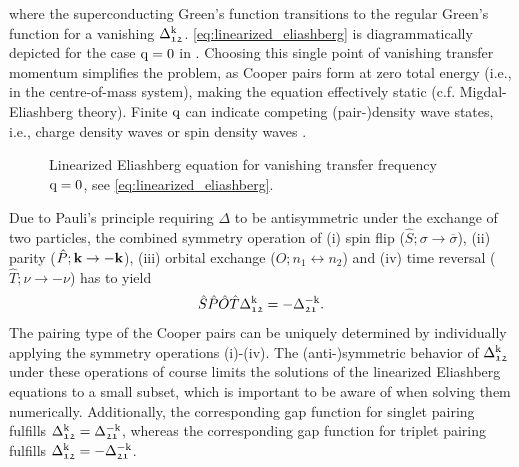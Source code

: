 \documentclass[../../main.tex]{subfiles}
\begin{document}
where the superconducting Green's function transitions to the regular Green's function for a vanishing $\Delta_{\mathfrak{12}}^{\text{k}}$. \eqref{eq:linearized_eliashberg} is diagrammatically depicted for the case $\text{q}=0$ in . Choosing this single point of vanishing transfer momentum simplifies the problem, as Cooper pairs form at zero total energy (i.e., in the centre-of-mass system), making the equation effectively static (c.f. Migdal-Eliashberg theory). Finite $\text{q}$ can indicate competing (pair-)density wave states, i.e., charge density waves or spin density waves \cite{yoshida pair density wave}.
\begin{figure}[ht!]
	\centering
  	
  	\caption{Linearized Eliashberg equation for vanishing transfer frequency $\text{q}=0$, see \eqref{eq:linearized_eliashberg}.}
  	\label{fig:linearized_eliashberg}
\end{figure}

Due to Pauli's principle requiring $\Delta$ to be antisymmetric under the exchange of two particles, the combined symmetry operation of (i) spin flip ($\hat S; \sigma\to\overline{\sigma}$), (ii) parity ($\hat P; \textbf{k}\to-\textbf{k}$), (iii) orbital exchange ($\hat O; n_1 \leftrightarrow n_2$) and (iv) time reversal ($\hat T; \nu\to-\nu$) has to yield
\begin{align}
	\hat S\hat P\hat O\hat T \Delta_{\mathfrak{12}}^{\text{k}} = -\Delta_{\mathfrak{21}}^{-\text{k}}.
\end{align}
The pairing type of the Cooper pairs can be uniquely determined by individually applying the symmetry operations (i)-(iv). The (anti-)symmetric behavior of $\Delta_{\mathfrak{12}}^{\text{k}}$ under these operations of course limits the solutions of the linearized Eliashberg equations to a small subset, which is important to be aware of when solving them numerically. Additionally, the corresponding gap function for singlet pairing fulfills $\Delta^{\text{k}}_{\mathfrak{12}}=\Delta^{-\text{k}}_{\mathfrak{21}}$, whereas the corresponding gap function for triplet pairing fulfills $\Delta^{\text{k}}_{\mathfrak{12}}=-\Delta_{\mathfrak{21}}^{-\text{k}}$.
\end{document}
